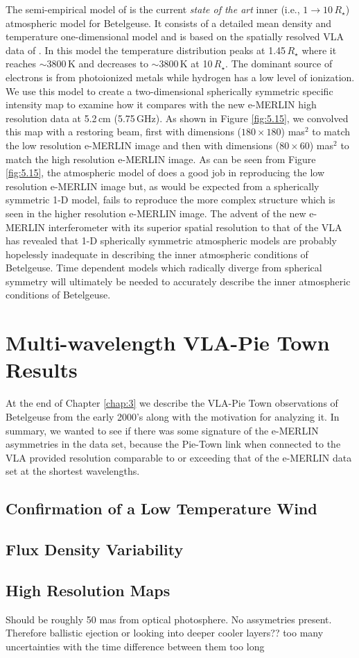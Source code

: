 The semi-empirical model of \cite{harper_2001} is the current \textit{state of the art} inner (i.e., $1 \rightarrow 10\,R_{\star}$) atmospheric model for Betelgeuse. It consists of a detailed mean density and temperature one-dimensional model and is based on the spatially resolved VLA data of \cite{lim_1998}. In this model the temperature distribution peaks at 1.45\,$R_{\star}$ where it reaches $\sim 3800$\,K and decreases to $\sim 3800$\,K at 10\,$R_{\star}$. The dominant source of electrons is from photoionized metals while hydrogen has a low level of ionization. 
We use this model to create a two-dimensional spherically symmetric specific intensity map to examine how it compares with the new e-MERLIN high resolution data at 5.2\,cm (5.75\,GHz). As shown in Figure \ref{fig:5.15}, we convolved this map with a restoring beam, first with dimensions ($180\times 180$) mas$^2$ to match the low resolution e-MERLIN image and then with dimensions ($80\times 60$) mas$^2$ to match the high resolution e-MERLIN image. As can be seen from Figure  \ref{fig:5.15}, the atmospheric model of \cite{harper_2001} does a good job in reproducing the low resolution e-MERLIN image but, as would be expected from a spherically symmetric 1-D model, fails to reproduce the more complex structure which is seen in the higher resolution e-MERLIN image. The advent of the new e-MERLIN interferometer with its superior spatial resolution to that of the VLA has revealed that 1-D spherically symmetric atmospheric models are probably hopelessly inadequate in describing the inner atmospheric conditions of Betelgeuse. Time dependent models which radically diverge from spherical symmetry will ultimately be needed to accurately describe the inner atmospheric conditions of Betelgeuse.

\section{Multi-wavelength VLA-Pie Town Results}\label{sec:5.13}
At the end of Chapter \ref{chap:3} we describe the VLA-Pie Town observations of Betelgeuse from the early 2000's along with the motivation for analyzing it. In summary, we wanted to see if there was some signature of the e-MERLIN asymmetries in the data set, because the Pie-Town link when connected to the VLA provided resolution comparable to or exceeding that of the e-MERLIN data set at the shortest wavelengths.

\subsection{Confirmation of a Low Temperature Wind}
\subsection{Flux Density Variability}
\subsection{High Resolution Maps}

Should be roughly 50 mas from optical photosphere. No assymetries present. Therefore ballistic ejection or looking into deeper cooler layers?? too many uncertainties with the time difference between them too long